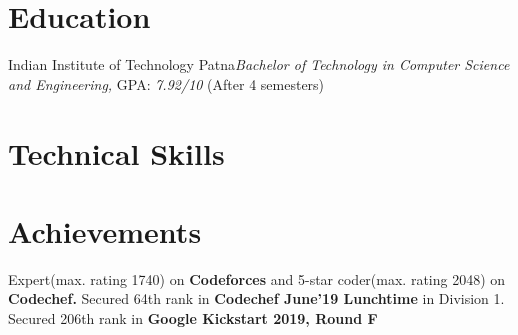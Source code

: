 \documentclass[10pt,a4paper,sans]{moderncv} %
\begin{document}
\makecvtitle %

\section{Education}

{Indian Institute of Technology Patna}{}{}{\textit{Bachelor of Technology in Computer Science and Engineering,} GPA: \textit{7.92/10} (After 4 semesters)}{}











\section{Technical Skills}
%

\section{Achievements}

 {Expert(max. rating 1740) on \textbf{Codeforces} and 5-star coder(max. rating 2048) on \textbf{Codechef.}}
 {Secured 64th rank in \textbf{Codechef June'19 Lunchtime} in Division 1.}
 {Secured 206th rank in \textbf{Google Kickstart 2019, Round F}}
\end{document}
